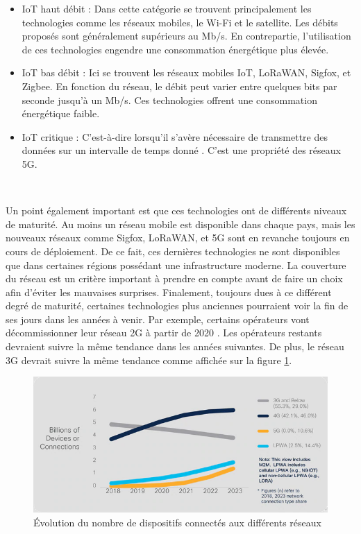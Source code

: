 \begin{itemize}
  \item IoT haut débit : Dans cette catégorie se trouvent principalement les technologies comme les réseaux mobiles, le Wi-Fi et le satellite. Les débits proposés sont généralement supérieurs au Mb/s. En contrepartie, l'utilisation de ces technologies engendre une consommation énergétique plus élevée.
  \item IoT bas débit : Ici se trouvent les réseaux mobiles IoT, LoRaWAN, Sigfox, et Zigbee. En fonction du réseau, le débit peut varier entre quelques bits par seconde jusqu'à un Mb/s. Ces technologies offrent une consommation énergétique faible.
  \item IoT critique : C'est-à-dire lorsqu'il s'avère nécessaire de transmettre des données sur un intervalle de temps donné \cite{orange_iot}. C'est une propriété des réseaux 5G.
\end{itemize}

~

\noindent
Un point également important est que ces technologies ont de différents niveaux de maturité. Au moins un réseau mobile est disponible dans chaque pays, mais les nouveaux réseaux comme Sigfox, LoRaWAN, et 5G sont en revanche toujours en cours de déploiement. De ce fait, ces dernières technologies ne sont disponibles que dans certaines régions possédant une infrastructure moderne. La couverture du réseau est un critère important à prendre en compte avant de faire un choix afin d'éviter les mauvaises surprises.
Finalement, toujours dues à ce différent degré de maturité, certaines technologies plus anciennes pourraient voir la fin de ses jours dans les années à venir. Par exemple, certains opérateurs vont décommissionner leur réseau 2G à partir de 2020 \cite{swisscom_2g}. Les opérateurs restants devraient suivre la même tendance dans les années suivantes. De plus, le réseau 3G devrait suivre la même tendance comme affichée sur la figure \ref{fig:evo_network}.

\begin{figure}[ht]
  \includegraphics[width=\textwidth]{img/state_of_the_art/network_evolution.png}
  \caption{Évolution du nombre de dispositifs connectés aux différents réseaux \cite{report_cisco}}
  \label{fig:evo_network}
\end{figure}



